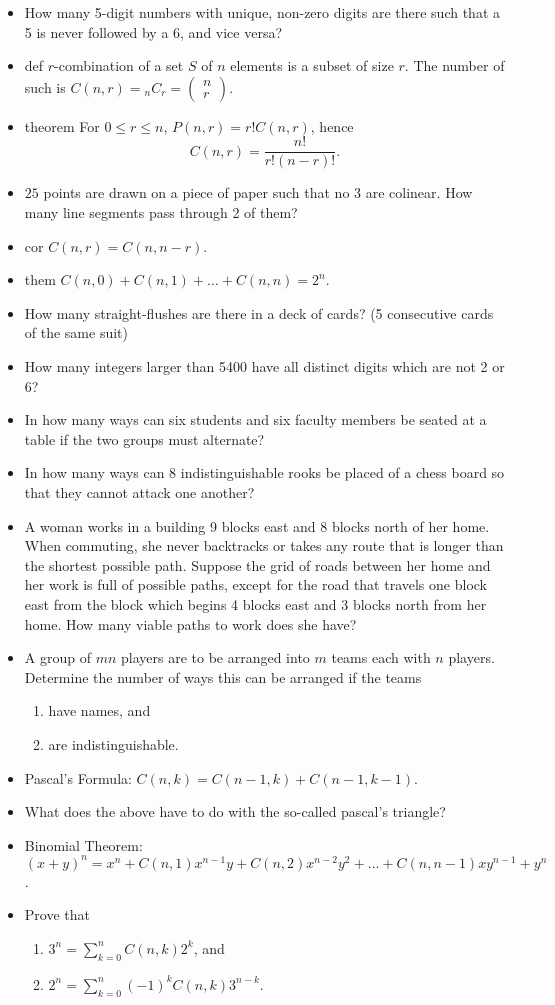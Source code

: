 \begin{itemize}
\item How many 5-digit numbers with unique, non-zero digits are there such that a 5 is never followed by a 6, and vice versa?
\item def $r$-combination of a set $S$ of $n$ elements is a subset of size $r$.  The number of such is $C(n, r) = {}_n C_r = \left(\begin{array}{c} n \\ r\end{array}\right)$.
\item theorem For $0 \leq r \leq n$, $P(n, r) = r! C(n, r)$, hence $$C(n, r) = \dfrac{n!}{r!(n-r)!}.$$
\item $25$ points are drawn on a piece of paper such that no 3 are colinear.  How many line segments pass through 2 of them?
\item cor $C(n, r) = C(n, n-r)$.
\item them $C(n, 0) + C(n, 1) + \ldots + C(n,n) = 2^n$.
\item How many straight-flushes are there in a deck of cards? (5 consecutive cards of the same suit)
\item How many integers larger than 5400 have all distinct digits which are not 2 or 6?
\item In how many ways can six students and six faculty members be seated at a table if the two groups must alternate?
\item In how many ways can 8 indistinguishable rooks be placed of a chess board so that they cannot attack one another?
\item A woman works in a building 9 blocks east and 8 blocks north of her home.  When commuting, she never backtracks or takes any route that is longer than the shortest possible path.  Suppose the grid of roads between her home and her work is full of possible paths, except for the road that travels one block east from the block which begins 4 blocks east and 3 blocks north from her home.  How many viable paths to work does she have?
\item A group of $mn$ players are to be arranged into $m$ teams each with $n$ players.  Determine the number of ways this can be arranged if the teams
\begin{enumerate}
    \item have names, and
    \item are indistinguishable.
\end{enumerate}
\item Pascal's Formula: $C(n, k) = C (n-1, k) + C(n-1, k-1)$.
\item What does the above have to do with the so-called pascal's triangle?
\item Binomial Theorem: $(x+y)^n = x^n + C(n,1) x^{n-1} y + C(n, 2) x^{n-2}y^2 + \ldots + C(n, n-1) x y^{n-1} + y^n$.
\item Prove that
\begin{enumerate}
    \item $\displaystyle 3^n = \sum_{k=0}^n C(n, k) 2^k$, and
    \item $\displaystyle 2^n = \sum_{k=0}^n (-1)^k C(n, k) 3^{n-k}$.
\end{enumerate}


\end{itemize}
